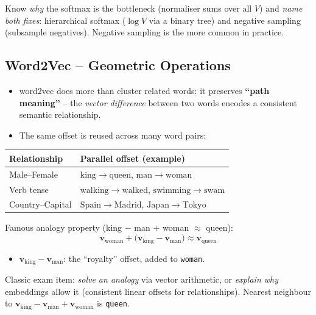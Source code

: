 \documentclass[10pt,a4paper]{article}
\begin{document}
	\begin{examtipbox}
		Know \emph{why} the softmax is the bottleneck (normaliser sums over all $V$) and \emph{name both fixes}: hierarchical softmax ($\log V$ via a binary tree) and negative sampling (subsample negatives). Negative sampling is the more common in practice.
	\end{examtipbox}

	\subsection{Word2Vec -- Geometric Operations}

	\begin{itemize}[leftmargin=*]
		\item word2vec does more than cluster related words: it preserves \textbf{``path meaning''} -- the \emph{vector difference} between two words encodes a consistent semantic relationship.
		\item The same offset is reused across many word pairs:
	\end{itemize}
	\begin{center}
	\begin{tabular}{ll}
		\toprule
		Relationship & Parallel offset (example) \\
		\midrule
		Male--Female & $\mathrm{king}\!\to\!\mathrm{queen}$, $\mathrm{man}\!\to\!\mathrm{woman}$ \\
		Verb tense   & $\mathrm{walking}\!\to\!\mathrm{walked}$, $\mathrm{swimming}\!\to\!\mathrm{swam}$ \\
		Country--Capital & $\mathrm{Spain}\!\to\!\mathrm{Madrid}$, $\mathrm{Japan}\!\to\!\mathrm{Tokyo}$ \\
		\bottomrule
	\end{tabular}
	\end{center}

	\begin{formulabox}
		Famous analogy property (king $-$ man $+$ woman $\approx$ queen):
		\[
		\mathbf{v}_{\text{woman}} + \big(\mathbf{v}_{\text{king}} - \mathbf{v}_{\text{man}}\big) \approx \mathbf{v}_{\text{queen}}
		\]
		\begin{itemize}[leftmargin=1.2em]
			\item $\mathbf{v}_{\text{king}}-\mathbf{v}_{\text{man}}$: the ``royalty'' offset, added to \texttt{woman}.
		\end{itemize}
	\end{formulabox}

	\begin{examtipbox}
		Classic exam item: \emph{solve an analogy} via vector arithmetic, or \emph{explain why} embeddings allow it (consistent linear offsets for relationships). Nearest neighbour to $\mathbf{v}_{\text{king}}-\mathbf{v}_{\text{man}}+\mathbf{v}_{\text{woman}}$ is \texttt{queen}.
	\end{examtipbox}
\end{document}
